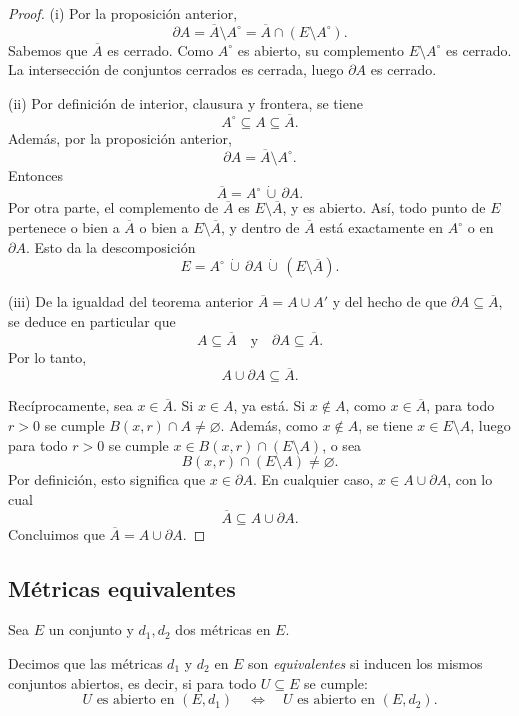 \begin{proof}
(i) Por la proposición anterior,
\[
\partial A = \overline{A} \setminus A^\circ
= \overline{A} \cap (E \setminus A^\circ).
\]
Sabemos que $\overline{A}$ es cerrado. Como $A^\circ$ es abierto,
su complemento $E \setminus A^\circ$ es cerrado. La intersección de
conjuntos cerrados es cerrada, luego $\partial A$ es cerrado.

\medskip

(ii) Por definición de interior, clausura y frontera, se tiene
\[
A^\circ \subseteq A \subseteq \overline{A}.
\]
Además, por la proposición anterior,
\[
\partial A = \overline{A} \setminus A^\circ.
\]
Entonces
\[
\overline{A} = A^\circ \,\dot\cup\, \partial A.
\]
Por otra parte, el complemento de $\overline{A}$ es
$E \setminus \overline{A}$, y es abierto. Así, todo punto de $E$
pertenece o bien a $\overline{A}$ o bien a $E \setminus \overline{A}$,
y dentro de $\overline{A}$ está exactamente en $A^\circ$ o en
$\partial A$. Esto da la descomposición
\[
E = A^\circ \,\dot\cup\, \partial A \,\dot\cup\, (E \setminus \overline{A}).
\]

\medskip

(iii) De la igualdad del teorema anterior
\(
\overline{A} = A \cup A'
\)
y del hecho de que $\partial A \subseteq \overline{A}$, se deduce
en particular que
\[
A \subseteq \overline{A}
\quad\text{y}\quad
\partial A \subseteq \overline{A}.
\]
Por lo tanto,
\[
A \cup \partial A \subseteq \overline{A}.
\]

Recíprocamente, sea $x \in \overline{A}$. Si $x \in A$, ya está.
Si $x \notin A$, como $x \in \overline{A}$, para todo $r>0$ se cumple
$B(x,r) \cap A \neq \varnothing$. Además, como $x \notin A$, se tiene
$x \in E \setminus A$, luego para todo $r>0$ se cumple
$x \in B(x,r) \cap (E \setminus A)$, o sea
\[
B(x,r) \cap (E \setminus A) \neq \varnothing.
\]
Por definición, esto significa que $x \in \partial A$.
En cualquier caso, $x \in A \cup \partial A$, con lo cual
\[
\overline{A} \subseteq A \cup \partial A.
\]
Concluimos que $\overline{A} = A \cup \partial A$.
\end{proof}

\subsection{Métricas equivalentes}

Sea $E$ un conjunto y $d_1,d_2$ dos métricas en $E$.

\begin{defi}
Decimos que las métricas $d_1$ y $d_2$ en $E$ son
\emph{equivalentes} si inducen los mismos conjuntos abiertos, es decir,
si para todo $U \subseteq E$ se cumple:
\[
U \text{ es abierto en } (E,d_1)
\quad \Longleftrightarrow \quad
U \text{ es abierto en } (E,d_2).
\]
\end{defi}

